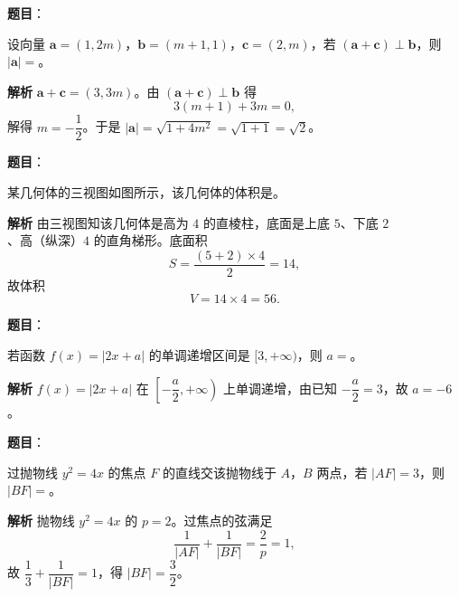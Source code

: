 \begin{answer}

\textbf{题目}：

设向量 $\boldsymbol a=(1,2m)$，$\boldsymbol b=(m+1,1)$，$\boldsymbol c=(2,m)$，若 $(\boldsymbol a+\boldsymbol c)\perp\boldsymbol b$，则 $|\boldsymbol a|=$\gkblank{}。

\textbf{解析}
$\boldsymbol a+\boldsymbol c=(3,3m)$。由 $(\boldsymbol a+\boldsymbol c)\perp\boldsymbol b$ 得
\nopagebreak[4]
\[3(m+1)+3m=0,\]
解得 $m=-\dfrac12$。于是 $|\boldsymbol a|=\sqrt{1+4m^2}=\sqrt{1+1}=\sqrt2$。


\end{answer}
\begin{answer}

\textbf{题目}：

某几何体的三视图如图所示，该几何体的体积是\gkblank{}。
\nopagebreak[4]
\begin{center}\end{center}
\nopagebreak[4]
\textbf{解析}
由三视图知该几何体是高为 $4$ 的直棱柱，底面是上底 $5$、下底 $2$、高（纵深）$4$ 的直角梯形。底面积
\nopagebreak[4]
\[S=\frac{(5+2)\times4}2=14,\]
故体积
\nopagebreak[4]
\[V=14\times4=56.\]


\end{answer}
\begin{answer}

\textbf{题目}：

若函数 $f(x)=|2x+a|$ 的单调递增区间是 $[3,+\infty)$，则 $a=$\gkblank{}。

\textbf{解析}
$f(x)=|2x+a|$ 在 $\left[-\dfrac a2,+\infty\right)$ 上单调递增，由已知 $-\dfrac a2=3$，故 $a=-6$。


\end{answer}
\begin{answer}

\textbf{题目}：

过抛物线 $y^2=4x$ 的焦点 $F$ 的直线交该抛物线于 $A$，$B$ 两点，若 $|AF|=3$，则 $|BF|=$\gkblank{}。

\textbf{解析}
抛物线 $y^2=4x$ 的 $p=2$。过焦点的弦满足
\nopagebreak[4]
\[\frac1{|AF|}+\frac1{|BF|}=\frac2p=1,\]
故 $\dfrac13+\dfrac1{|BF|}=1$，得 $|BF|=\dfrac32$。


\end{answer}

